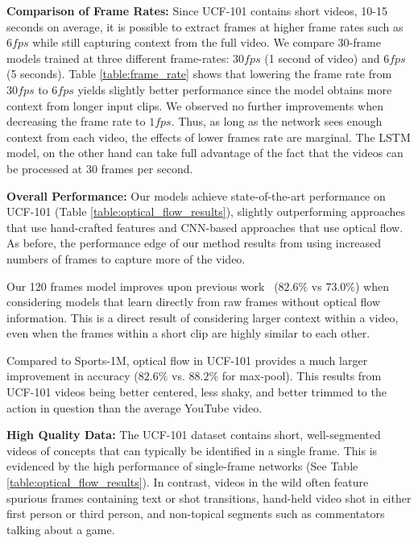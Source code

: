 \documentclass[10pt,twocolumn,letterpaper]{article}
\begin{document}
\textbf{Comparison of Frame Rates:} Since UCF-101 contains short
videos, 10-15 seconds on average, it is possible to extract frames at
higher frame rates such as $6 fps$ while still capturing context from
the full video. We compare 30-frame models trained at three different
frame-rates: $30 fps$ (1 second of video) and $6 fps$ (5 seconds). Table
\ref{table:frame_rate} shows that lowering the frame rate from $30 fps$ to $6
fps$ yields slightly better performance since the model obtains more context
from longer input clips.  We observed no further improvements when decreasing
the frame rate to $1 fps$. Thus, as long as the network sees enough context
from each video, the effects of lower frames rate are marginal. The LSTM model,
on the other hand can take full advantage of the fact that the videos can be
processed at 30 frames per second.

\textbf{Overall Performance:} Our models achieve state-of-the-art
performance on UCF-101 (Table \ref{table:optical_flow_results}),
slightly outperforming approaches that use hand-crafted features and
CNN-based approaches that use optical flow. As before, the performance
edge of our method results from using increased numbers of frames
to capture more of the video.


Our 120 frames model improves upon previous work~\cite{simonyan2014two} ($82.6\%$ vs $73.0\%$) when considering models that learn directly from raw frames
 without optical flow information. This is a direct result of considering larger context within a video, even when the frames within a short clip are
 highly similar to each other.

Compared to Sports-1M, optical flow in UCF-101
provides a much larger improvement in accuracy ($82.6\%$ vs. $88.2\%$ for max-pool).
This results from UCF-101 videos being better centered, less shaky, and better
trimmed to the action in question than the average YouTube video.

\textbf{High Quality Data:} The UCF-101 dataset contains short,
well-segmented videos of concepts that can typically be identified in a single
frame. This is evidenced by the high performance of single-frame networks
(See Table \ref{table:optical_flow_results}). In contrast, videos in the wild often
feature spurious frames containing text or shot transitions, hand-held video
shot in either first person or third person, and non-topical segments such as
commentators talking about a game.
\end{document}
